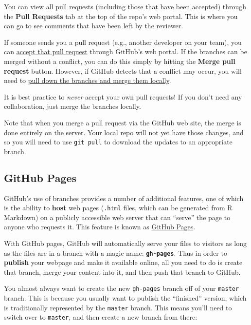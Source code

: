 \documentclass[]{book}
\theoremstyle{definition}
\theoremstyle{definition}
\theoremstyle{remark}
\begin{document}
You can view all pull requests (including those that have been accepted)
through the \textbf{Pull Requests} tab at the top of the repo's web
portal. This is where you can go to see comments that have been left by
the reviewer.

If someone sends you a pull request (e.g., another developer on your
team), you can
\href{https://help.github.com/articles/merging-a-pull-request/}{accept
that pull request} through GitHub's web portal. If the branches can be
merged without a conflict, you can do this simply by hitting the
\textbf{Merge pull request} button. However, if GitHub detects that a
conflict may occur, you will need to
\href{https://help.github.com/articles/checking-out-pull-requests-locally}{pull
down the branches and merge them locally}.

It is best practice to \emph{never} accept your own pull requests! If
you don't need any collaboration, just merge the branches locally.

Note that when you merge a pull request via the GitHub web site, the
merge is done entirely on the server. Your local repo will not yet have
those changes, and so you will need to use \texttt{git\ pull} to
download the updates to an appropriate branch.

\subsection{GitHub Pages}\label{github-pages}

GitHub's use of branches provides a number of additional features, one
of which is the ability to \textbf{host} web pages (\texttt{.html}
files, which can be generated from R Markdown) on a publicly accessible
web server that can ``serve'' the page to anyone who requests it. This
feature is known as
\href{https://help.github.com/articles/what-is-github-pages/}{GitHub
Pages}.

With GitHub pages, GitHub will automatically serve your files to
visitors as long as the files are in a branch with a magic name:
\textbf{\texttt{gh-pages}}. Thus in order to \textbf{publish} your
webpage and make it available online, all you need to do is create that
branch, merge your content into it, and then push that branch to GitHub.

You almost always want to create the new \texttt{gh-pages} branch off of
your \texttt{master} branch. This is because you usually want to publish
the ``finished'' version, which is traditionally represented by the
\texttt{master} branch. This means you'll need to switch over to
\texttt{master}, and then create a new branch from there:
\end{document}
